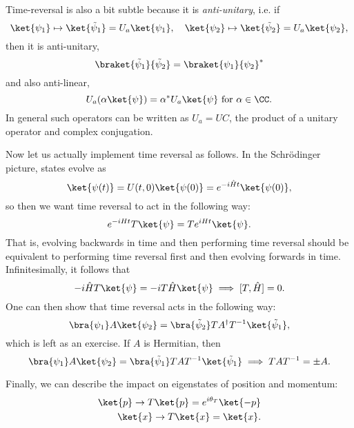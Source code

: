 Time-reversal is also a bit subtle because it is \emph{anti-unitary}, i.e. if
\begin{equation}
    \ket{\psi_1} \mapsto \ket{\tilde \psi_1} = U_a \ket{\psi_1}, \quad \ket{\psi_2} \mapsto \ket{\tilde \psi_2} = U_a \ket{\psi_2},
\end{equation}
then it is anti-unitary,
\begin{equation}
    \braket{\tilde \psi_1}{\tilde \psi_2} = \braket{\psi_1}{\psi_2}^*
\end{equation}
and also anti-linear,
\begin{equation}
    U_a (\alpha \ket{\psi}) = \alpha^* U_a \ket{\psi}\text{ for }\alpha\in \CC.
\end{equation}
In general such operators can be written as $U_a = U C$, the product of a unitary operator and complex conjugation.

Now let us actually implement time reversal as follows. In the Schr\"odinger picture, states evolve as
\begin{equation}
    \ket{\psi(t)} = U(t,0) \ket{\psi(0)} = e^{-i\hat H t} \ket{\psi(0)},
\end{equation}
so then we want time reversal to act in the following way:
\begin{equation}
    e^{-iH t} T\ket{\psi} = Te^{iHt} \ket{\psi}.
\end{equation}
That is, evolving backwards in time and then performing time reversal should be equivalent to performing time reversal first and then evolving forwards in time. Infinitesimally, it follows that
\begin{equation}
    -i\hat H T \ket{\psi} = -i T \hat H \ket{\psi} \implies [T,\hat H]=0.
\end{equation}
One can then show that time reversal acts in the following way:
\begin{equation}
    \bra{\psi_1} A \ket{\psi_2} = \bra{\tilde \psi_2} TA^\dagger T^{-1} \ket{\tilde \psi_1},
\end{equation}
which is left as an exercise. If $A$ is Hermitian, then
\begin{equation}
    \bra{\psi_1} A \ket{\psi_2} = \bra{\tilde \psi_1} TAT^{-1} \ket{\tilde \psi_1} \implies TAT^{-1} = \pm A.
\end{equation}

Finally, we can describe the impact on eigenstates of position and momentum:
\begin{align}
    \ket{p} \to T \ket{p} = e^{i\theta_T} \ket{-p}\\
    \ket{x} \to T \ket{x} = \ket{x}.
\end{align}